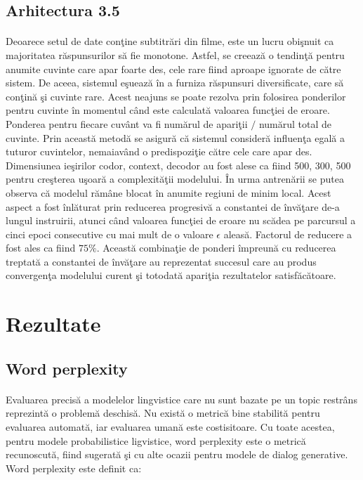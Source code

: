 \subsection{Arhitectura 3.5}

\paragraph{}
Deoarece setul de date con\c tine subtitr\u ari din filme, este un lucru obi\c snuit ca majoritatea r\u aspunsurilor s\u a fie monotone. Astfel, se creeaz\u a o tendin\c t\u a pentru anumite cuvinte care apar foarte des, cele rare fiind aproape ignorate de c\u atre sistem. De aceea, sistemul e\c sueaz\u a \^ in a furniza r\u aspunsuri diversificate, care s\u a con\c tin\u a \c si cuvinte rare. Acest neajuns se poate rezolva prin folosirea ponderilor pentru cuvinte \^ in momentul c\^ and este calculat\u a valoarea func\c tiei de eroare. Ponderea pentru fiecare cuv\^ ant va fi num\u arul de apari\c tii \(/\) num\u arul total de cuvinte. Prin aceast\u a metod\u a se asigur\u a c\u a sistemul consider\u a influen\c ta egal\u a a tuturor cuvintelor, nemaiav\^ and o predispozi\c tie c\u atre cele care apar des. Dimensiunea ie\c sirilor codor, context, decodor au fost alese ca fiind 500, 300, 500 pentru cre\c sterea u\c soar\u a a complexit\u a\c tii modelului. \^ In urma antren\u arii se putea observa c\u a modelul r\u am\^ ane blocat \^ in anumite regiuni de minim local. Acest aspect a fost \^ inl\u aturat prin reducerea progresiv\u a a constantei de \^ inv\u a\c tare de-a lungul instruirii, atunci c\^ and valoarea func\c tiei de eroare nu sc\u adea pe parcursul a cinci epoci consecutive cu mai mult de o valoare \(\epsilon\) aleas\u a. Factorul de reducere a fost ales ca fiind \(75\%\). Aceast\u a combina\c tie de ponderi \^ impreun\u a cu reducerea treptat\u a a constantei de \^ inv\u a\c tare au reprezentat succesul care au produs convergen\c ta modelului curent \c si totodat\u a apari\c tia rezultatelor satisf\u ac\u atoare.

\section{Rezultate}

\subsection{Word perplexity}

\paragraph{}
Evaluarea precis\u a a modelelor lingvistice care nu sunt bazate pe un topic restr\^ ans reprezint\u a o problem\u a deschis\u a. Nu exist\u a o metric\u a bine stabilit\u a pentru evaluarea automat\u a, iar evaluarea uman\u a este costisitoare. Cu toate acestea, pentru modele probabilistice ligvistice, word perplexity \cite{Bengio:2003:NPL:944919.944966} este o metric\u a recunoscut\u a, fiind sugerat\u a \c si cu alte ocazii pentru modele de dialog generative. Word perplexity este definit ca:


